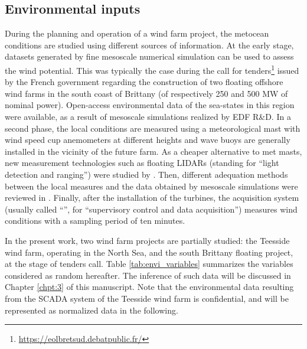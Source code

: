 \subsection{Environmental inputs}\label{sec:metocean_uncertainties}
During the planning and operation of a wind farm project, the metocean conditions are studied using different sources of information. 
At the early stage, datasets generated by fine mesoscale numerical simulation can be used to assess the wind potential. 
This was typically the case during the call for tenders\footnote{\url{https://eolbretsud.debatpublic.fr/}} issued by the French government regarding the construction of two floating offshore wind farms in the south coast of Brittany (of respectively 250 and 500 MW of nominal power). 
Open-access environmental data of the sea-states in this region were available, as a result of mesoscale simulations \citep{raoult_2018_anemoc3} realized by EDF R\&D.    
In a second phase, the local conditions are measured using a meteorological mast with wind speed cup anemometers at different heights and wave buoys are generally installed in the vicinity of the future farm. 
As a cheaper alternative to met masts, new measurement technologies such as floating LIDARs (standing for ``light detection and ranging'') were studied by \citet{gottschall_2017_floating_LIDAR}. 
Then, different adequation methods between the local measures and the data obtained by mesoscale simulations were reviewed in \citet{sempreviva_2008_wind_assessment_review}.  
Finally, after the installation of the turbines, the acquisition system (usually called ``'', for ``supervisory control and data acquisition'') measures wind conditions with a sampling period of ten minutes. 

In the present work, two wind farm projects are partially studied\footnotemark: the Teesside wind farm, operating in the North Sea, and the south Brittany floating project, at the stage of tenders call. 
Table \ref{tab:envi_variables} summarizes the variables considered as random hereafter. 
The inference of such data will be discussed in Chapter \ref{chpt:3} of this manuscript. 
Note that the environmental data resulting from the SCADA system of the Teesside wind farm is confidential, and will be represented as normalized data in the following. 


